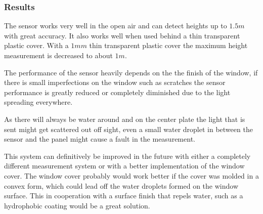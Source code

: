 \subsubsection{Results}
The sensor works very well in the open air and can detect heights up to $1.5m$ with great accuracy. It also works well when used behind a thin transparent plastic cover. With a $1mm$ thin transparent plastic cover the maximum height measurement is decreased to about $1m$. 

The performance of the sensor heavily depends on the the finish of the window, if there is small imperfections on the window such as scratches the sensor performance is greatly reduced or completely diminished due to the light spreading everywhere.

As there will always be water around and on the center plate the light that is sent might get scattered out off sight, even a small water droplet in between the sensor and the panel might cause a fault in the measurement.  

This system can definitively be improved in the future with either a completely different measurement system or with a better implementation of the window cover. The window cover probably would work better if the cover was molded in a convex form, which could lead off the water droplets formed on the window surface. This in cooperation with a surface finish that repels water, such as a hydrophobic coating would be a great solution. 
